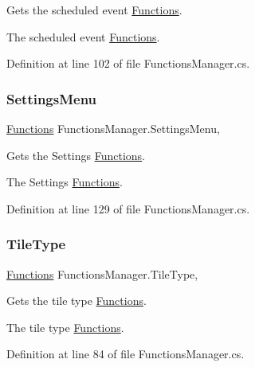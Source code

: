 Gets the scheduled event \hyperlink{class_functions}{Functions}. 

The scheduled event \hyperlink{class_functions}{Functions}.

Definition at line 102 of file Functions\+Manager.\+cs.

\mbox{\label{class_functions_manager_aa0e89c5eaec08e891e29c93ee7181ead}} 
\subsubsection{\texorpdfstring{Settings\+Menu}{SettingsMenu}}
{\footnotesize\ttfamily \hyperlink{class_functions}{Functions} Functions\+Manager.\+Settings\+Menu\hspace{0.3cm}{\ttfamily [static]}, {\ttfamily [get]}}



Gets the Settings \hyperlink{class_functions}{Functions}. 

The Settings \hyperlink{class_functions}{Functions}.

Definition at line 129 of file Functions\+Manager.\+cs.

\mbox{\label{class_functions_manager_a786579d69f98ed215b3430f8467d51e1}} 
\subsubsection{\texorpdfstring{Tile\+Type}{TileType}}
{\footnotesize\ttfamily \hyperlink{class_functions}{Functions} Functions\+Manager.\+Tile\+Type\hspace{0.3cm}{\ttfamily [static]}, {\ttfamily [get]}}



Gets the tile type \hyperlink{class_functions}{Functions}. 

The tile type \hyperlink{class_functions}{Functions}.

Definition at line 84 of file Functions\+Manager.\+cs.

\mbox{\label{class_functions_manager_af3ecee4c8c9b81690a58ee7f41fe6de1}} 
